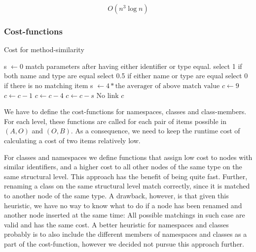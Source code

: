 \documentclass[11pt]{article}
\begin{document}
\begin{equation}
O(n^3 \log n)  \nonumber
\end{equation}

\subsubsection{Cost-functions}

\begin{algorithm}
\caption{Cost for method-similarity}
\label{MethodCostFunction}
\begin{algorithmic}
   \State s $\gets 0$
      \State match parameters after having either identifier or type equal.
	      \State select 1 if both name and type are equal
    	  \State select 0.5 if either name or type are equal
	      \State select 0 if there is no matching item
      \EndFor
      \State s $\gets 4* \text{the averager of above match value}$
   \EndIf
   \State $c \gets 9$
      \State $c \gets c - 1$
   \EndIf
      \State $c \gets c - 4$
   \EndIf
   \State $c \gets c - s$
         \State \Return No link
   \EndIf
   \State \Return $c$
\EndFunction
\end{algorithmic}
\end{algorithm}

We have to define the cost-functions for namespaces, classes and class-members. For each level, these functions are called for each pair of items possible in $(A, O)$ and $(O, B)$. As a consequence, we need to keep the runtime cost of calculating a cost of two items relatively low.

For classes and namespaces we define functions that assign low cost to nodes with similar identifiers, and a higher cost to all other nodes of the same type on the same structural level. This approach has the benefit of being quite fast. Further, renaming a class on the same structural level match correctly, since it is matched to another node of the same type. A drawback, however, is that given this heuristic, we have no way to know what to do if a node has been renamed and another node inserted at the same time: All possible matchings in such case are valid and has the same cost. A better heuristic for namespaces and classes probably is to also include the different members of namespaces and classes as a part of the cost-function, however we decided not pursue this approach further.
\end{document}
